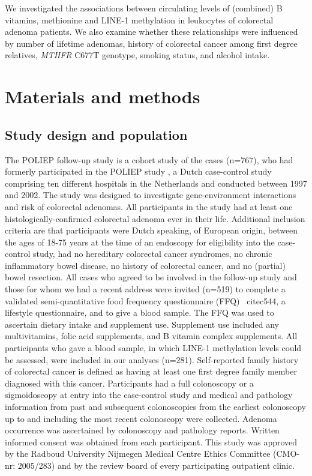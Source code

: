 \noindent We investigated the associations between circulating levels of (combined) B vitamins, methionine and LINE-1 methylation in leukocytes of colorectal adenoma patients. We also examine whether these relationships were influenced by number of lifetime adenomas, history of colorectal cancer among first degree relatives, \emph{MTHFR} C677T genotype, smoking status, and alcohol intake.

\section[]{Materials and methods} %
\subsection{Study design and population} %
\noindent The POLIEP follow-up study is a cohort study of the cases (n=767), who had formerly participated in the POLIEP study \cite{c543}, a Dutch case-control study comprising ten different hospitals in the Netherlands and conducted between 1997 and 2002. The study was designed to investigate gene-environment interactions and risk of colorectal adenomas. All participants in the study had at least one histologically-confirmed colorectal adenoma ever in their life. Additional inclusion criteria are that participants were Dutch speaking, of European origin, between the ages of 18-75 years at the time of an endoscopy for eligibility into the case-control study, had no hereditary colorectal cancer syndromes, no chronic inflammatory bowel disease, no history of colorectal cancer, and no (partial) bowel resection. All cases who agreed to be involved in the follow-up study and those for whom we had a recent address were invited (n=519) to complete a validated semi-quantitative food frequency questionnaire (FFQ) \
cite{c544}, a lifestyle questionnaire, and to give a blood sample. The FFQ was used to ascertain dietary intake and supplement use. Supplement use included any multivitamins, folic acid supplements, and B vitamin complex supplements. All participants who gave a blood sample, in which LINE-1 methylation levels could be assessed, were included in our analyses (n=281). Self-reported family history of colorectal cancer is defined as having at least one first degree family member diagnosed with this cancer. Participants had a full colonoscopy or a sigmoidoscopy at entry into the case-control study and medical and pathology information from past and subsequent colonoscopies from the earliest colonoscopy up to and including the most recent colonoscopy were collected. Adenoma occurrence was ascertained by colonoscopy and pathology reports. Written informed consent was obtained from each participant. This study was approved by the Radboud University Nijmegen Medical Centre Ethics Committee (CMO-nr: 2005/283) and by 
the review board of every participating outpatient clinic.

